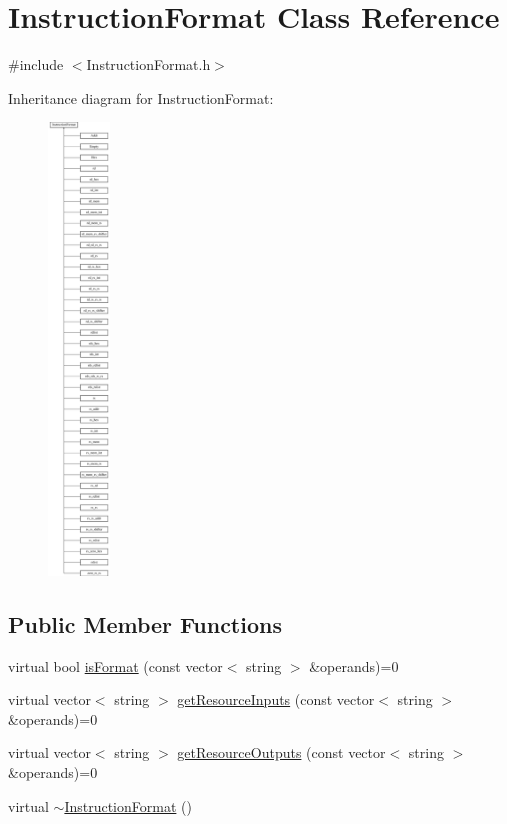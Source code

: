\hypertarget{classInstructionFormat}{}\section{Instruction\+Format Class Reference}
\label{classInstructionFormat}


{\ttfamily \#include $<$Instruction\+Format.\+h$>$}

Inheritance diagram for Instruction\+Format\+:\begin{figure}[H]
\begin{center}
\leavevmode
\includegraphics[height=12.000000cm]{classInstructionFormat}
\end{center}
\end{figure}
\subsection*{Public Member Functions}
\begin{DoxyCompactItemize}
\item 
virtual bool \hyperlink{classInstructionFormat_a9fdcf94dcd7d9a55ba86e7a63f04d1fe}{is\+Format} (const vector$<$ string $>$ \&operands)=0
\item 
virtual vector$<$ string $>$ \hyperlink{classInstructionFormat_a09775d3a3c22f40a0f44504664e586e4}{get\+Resource\+Inputs} (const vector$<$ string $>$ \&operands)=0
\item 
virtual vector$<$ string $>$ \hyperlink{classInstructionFormat_a95cd28ffb1bde59b67f676880ab10536}{get\+Resource\+Outputs} (const vector$<$ string $>$ \&operands)=0
\item 
virtual \hyperlink{classInstructionFormat_a104e78d49e31e4e88ac9545dbadf9f7a}{$\sim$\+Instruction\+Format} ()
\end{DoxyCompactItemize}


